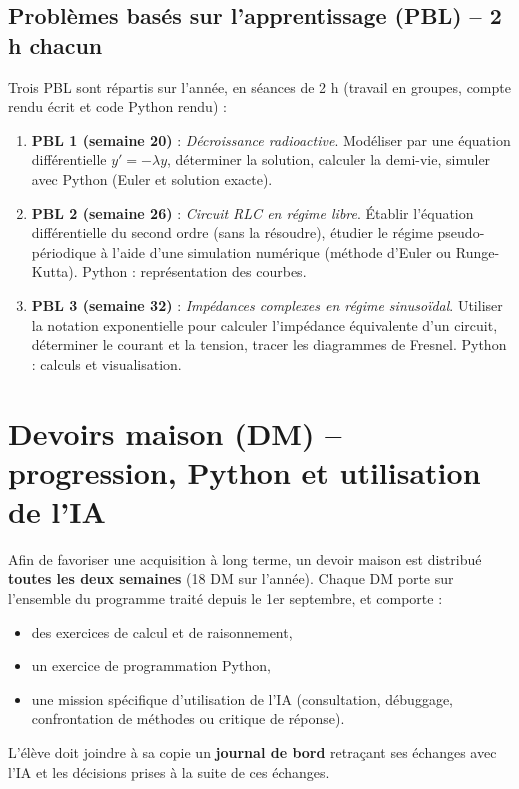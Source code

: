 \documentclass[a4paper,12pt]{article}
\begin{document}
	\subsection{Problèmes basés sur l’apprentissage (PBL) – 2 h chacun}
	Trois PBL sont répartis sur l’année, en séances de 2 h (travail en groupes, compte rendu écrit et code Python rendu) :
	
	\begin{enumerate}
		\item \textbf{PBL 1 (semaine 20)} : \emph{Décroissance radioactive}. Modéliser par une équation différentielle $y'= -\lambda y$, déterminer la solution, calculer la demi-vie, simuler avec Python (Euler et solution exacte).
		\item \textbf{PBL 2 (semaine 26)} : \emph{Circuit RLC en régime libre}. Établir l’équation différentielle du second ordre (sans la résoudre), étudier le régime pseudo-périodique à l’aide d’une simulation numérique (méthode d’Euler ou Runge-Kutta). Python : représentation des courbes.
		\item \textbf{PBL 3 (semaine 32)} : \emph{Impédances complexes en régime sinusoïdal}. Utiliser la notation exponentielle pour calculer l’impédance équivalente d’un circuit, déterminer le courant et la tension, tracer les diagrammes de Fresnel. Python : calculs et visualisation.
	\end{enumerate}
	
	\section{Devoirs maison (DM) -- progression, Python et utilisation de l’IA}
	
	Afin de favoriser une acquisition à long terme, un devoir maison est distribué \textbf{toutes les deux semaines} (18 DM sur l’année).  
	Chaque DM porte sur l’ensemble du programme traité depuis le 1er septembre, et comporte :
	\begin{itemize}
		\item des exercices de calcul et de raisonnement,
		\item un exercice de programmation Python,
		\item une mission spécifique d’utilisation de l’IA (consultation, débuggage, confrontation de méthodes ou critique de réponse).
	\end{itemize}
	
	L’élève doit joindre à sa copie un \textbf{journal de bord} retraçant ses échanges avec l’IA et les décisions prises à la suite de ces échanges.
	
\end{document}

